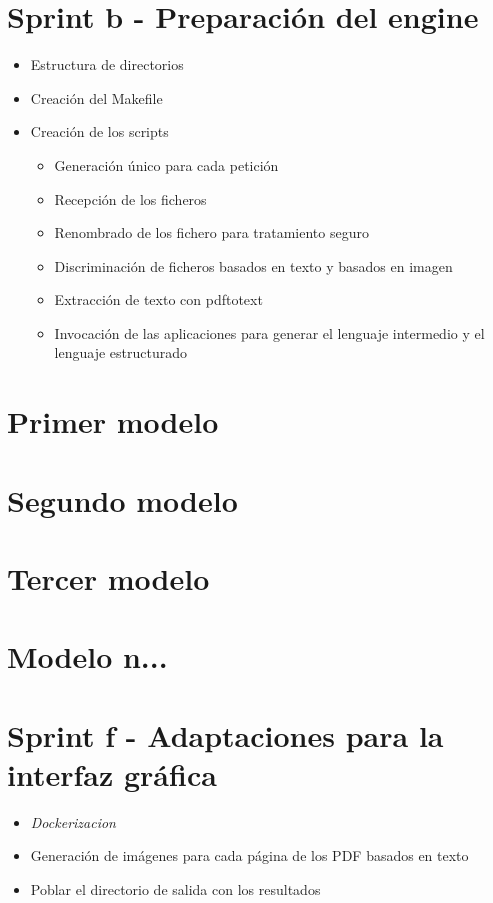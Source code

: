 \section{Sprint b - Preparación del engine}
\begin{itemize}
    \item Estructura de directorios
    \item Creación del Makefile
    \item Creación de los scripts
    \begin{itemize}
        \item Generación único para cada petición
        \item Recepción de los ficheros
        \item Renombrado de los fichero para tratamiento seguro
        \item Discriminación de ficheros basados en texto y basados en imagen
        \item Extracción de texto con pdftotext
        \item Invocación de las aplicaciones para generar el lenguaje intermedio y el lenguaje estructurado
    \end{itemize}
\end{itemize}

\section{Primer modelo}
\section{Segundo modelo}
\section{Tercer modelo}
\section{Modelo n...}
\section{Sprint f - Adaptaciones para la interfaz gráfica}
\begin{itemize}
    \item \emph{Dockerizacion}
    \item Generación de imágenes para cada página de los PDF basados en texto
    \item Poblar el directorio de salida con los resultados
\end{itemize}

